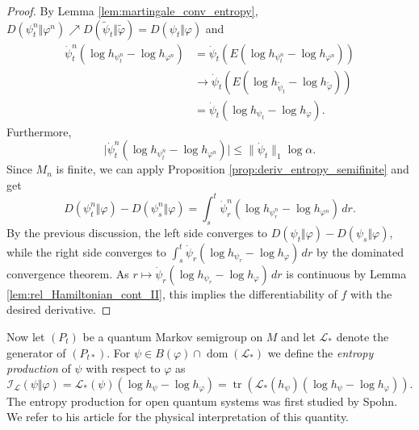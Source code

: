 \documentclass[12pt,a4paper]{amsart}
\newcommand{\1}{\mathds{1}}
\newcommand{\tr}{\operatorname{tr}}
\renewcommand{\phi}{\varphi}
\newcommand{\I}{\mathcal I}
\renewcommand{\L}{\mathcal L}
\newcommand{\dom}{\operatorname{dom}}
\newcommand{\abs}[1]{\lvert#1\rvert}
\newcommand{\norm}[1]{\lVert#1\rVert}
\theoremstyle{plain}
\theoremstyle{definition}
\theoremstyle{remark}
\begin{document}
\begin{proof}
By Lemma \ref{lem:martingale_conv_entropy}, $D(\psi^n_t\Vert \phi^n)\nearrow D(\tilde\psi_t\Vert \tilde\phi)=D(\psi_t\Vert \phi)$ and
\begin{align*}
\dot\psi^n_t(\log h_{\psi^n_t}-\log h_{\phi^n})&=\dot \psi_t(E(\log h_{\psi^n_t}-\log h_{\phi^n}))\\
&\to \dot\psi_t(E(\log h_{\tilde \psi_t}-\log h_{\tilde\phi}))\\
&=\dot\psi_t(\log h_{\psi_t}-\log h_\phi).
\end{align*}
Furthermore,
\begin{equation*}
\abs{\dot\psi^n_t(\log h_{\psi^n_t}-\log h_{\phi^n})}\leq \norm{\dot\psi_t}_1\log \alpha.
\end{equation*}
Since $M_n$ is finite, we can apply Proposition \ref{prop:deriv_entropy_semifinite} and get
\begin{equation*}
D(\psi^n_t\Vert \phi)-D(\psi^n_s\Vert \phi)=\int_s^t \dot \psi^n_r(\log h_{\psi^n_r}-\log h_{\phi^n})\,dr.
\end{equation*}
By the previous discussion, the left side converges to $D(\psi_t\Vert \phi)-D(\psi_s\Vert\phi)$, while the right side converges to $\int_s^t \dot\psi_r(\log h_{\psi_r}-\log h_\phi)\,dr$ by the dominated convergence theorem. As $r\mapsto \dot\psi_r(\log h_{\psi_r}-\log h_\phi)\,dr$ is continuous by Lemma \ref{lem:rel_Hamiltonian_cont_II}, this implies the differentiability of $f$ with the desired derivative.
\end{proof}

Now let $(P_t)$ be a quantum Markov semigroup on $M$ and let $\L_\ast$ denote the generator of $(P_{t\ast})$. For $\psi\in B(\phi)\cap \dom(\L_\ast)$ we define the \emph{entropy production} of $\psi$ with respect to $\phi$ as
\begin{equation*}
\I_\L(\psi\Vert \phi)=\L_\ast(\psi)(\log h_\psi-\log h_\phi)=\tr(\L_\ast(h_\psi)(\log h_\psi-\log h_\phi)).
\end{equation*}
The entropy production for open quantum systems was first studied by Spohn. We refer to his article \cite{Spo78} for the physical interpretation of this quantity.
\end{document}
